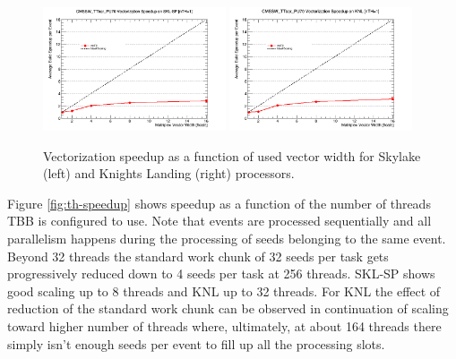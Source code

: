 \documentclass{webofc}
\def\twop{0.48\textwidth}
\def\postfigskip{\vskip-4mm}
\begin{document}
\begin{figure}[htb]
  \centering
  \includegraphics[width=\twop]{figs/comp/SKL-SP_CMSSW_TTbar_PU70_VU_speedup.png}
  \hfill
  \includegraphics[width=\twop]{figs/comp/KNL_CMSSW_TTbar_PU70_VU_speedup.png}
  \postfigskip

  \caption{Vectorization speedup as a function of used vector width for
    Skylake (left) and Knights Landing (right)
    processors.}
  \label{fig:vu-speedup}
\end{figure}

Figure \ref{fig:th-speedup} shows speedup as a function of the number of threads
TBB is configured to use. Note that events are processed sequentially and all
parallelism happens during the processing of seeds belonging to the same
event. Beyond 32 threads the standard work chunk of 32 seeds per task gets
progressively reduced down to 4 seeds per task at 256 threads.
SKL-SP shows good scaling up to 8 threads and KNL up to 32 threads.
For KNL the effect of reduction of the standard work chunk can be observed
in continuation of scaling toward higher number of threads where, ultimately, at
about 164 threads there simply isn't enough seeds per event to fill up all
the processing slots.
\end{document}
